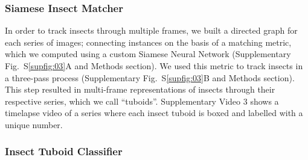 \documentclass[12pt]{article}
\begin{document}
\begin{linenumbers}
		\subsubsection*{Siamese Insect Matcher}
		In order to track insects through multiple frames, we built a directed graph for each series of images; connecting instances on the basis of a matching metric, which we computed using a custom Siamese Neural Network (Supplementary Fig.~S\ref{supfig:03}A and Methods section). We used this metric to track insects in a three-pass process (Supplementary Fig.~S\ref{supfig:03}B and Methods section). This step resulted in multi-frame representations of insects through their respective series, which we call “tuboids”. Supplementary Video 3 shows a timelapse video of a series where each insect tuboid is boxed and labelled with a unique number.

		\subsubsection*{Insect Tuboid Classifier}


\end{linenumbers}
\end{document}
